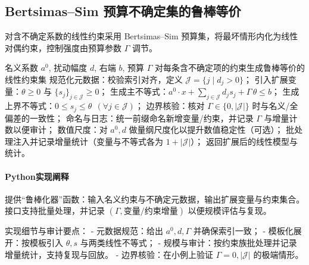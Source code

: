 \clearpage

\subsection{Bertsimas--Sim 预算不确定集的鲁棒等价}
对含不确定系数的线性约束采用 Bertsimas--Sim 预算集，将最坏情形内化为线性对偶约束，控制强度由预算参数 $\Gamma$ 调节。
\begin{algorithm}[H]
  \caption{Bertsimas--Sim 预算不确定集的鲁棒等价}
  \label{lst:bs-robust-counterpart}
  \begin{algorithmic}[1]
    \Require 名义系数 $a^0$, 扰动幅度 $d$, 右端 $b$, 预算 $\Gamma$
    \Ensure 对每条含不确定项的约束生成鲁棒等价的线性约束集
    \State 规范化元数据：校验索引对齐，定义 $\mathcal{J}=\{j\mid d_j>0\}$；
    \State 引入扩展变量：$\theta\ge0$ 与 $\{s_j\}_{j\in\mathcal{J}}\ge0$；
    \State 生成主不等式：$a^0\!\cdot x + \sum_{j\in\mathcal{J}} d_j s_j + \Gamma\,\theta \le b$；
    \State 生成上界不等式：$0\le s_j\le\theta\ \ (\forall j\in\mathcal{J})$；
    \State 边界核验：核对 $\Gamma\in\{0,|\mathcal{J}|\}$ 时与名义/全偏差的一致性；
    \State 命名与日志：统一前缀命名新增变量/约束，并记录 $\Gamma$ 与增量计数以便审计；
    \State 数值尺度：对 $a^0,d$ 做量纲尺度化以提升数值稳定性（可选）；
    \State 批处理注入并记录增量统计（变量与不等式各为 $1+|\mathcal{J}|$）；
    \State 返回扩展后的线性模型与统计。
  \end{algorithmic}
\end{algorithm}
\paragraph{Python实现阐释}
提供“鲁棒化器”函数：输入名义约束与不确定元数据，输出扩展变量与约束集合。接口支持批量处理，并记录 $(\Gamma,\text{变量/约束增量})$ 以便规模评估与复现。

实现细节与审计要点：
- 元数据规范：给出 $a^0,d,\Gamma$ 并确保索引一致；
- 模板化展开：按模板引入 $\theta, s$ 与两类线性不等式；
- 规模与审计：按约束族批处理并记录增量统计，支持复现与回放。
 - 边界核验：在小例上验证 $\Gamma=0,|\mathcal{J}|$ 的极端情形。

\newpage

\begin{center}
\begin{minipage}[t][\dimexpr\textheight-1em\relax]{0.98\linewidth}

\end{minipage}
\end{center}

